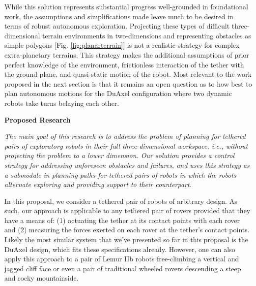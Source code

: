 \documentclass[12pt]{article}
\begin{document}
While this solution represents substantial progress well-grounded in foundational work, the 
assumptions and simplifications made leave much to be desired in terms of robust autonomous
exploration. Projecting these types of difficult three-dimensional terrain environments in two-dimensions and representing obstacles as simple polygons [Fig. \ref{fig:planarterrain}] is not a realistic strategy for complex extra-planetary terrains. 
This strategy makes the additional assumptions of prior perfect knowledge of the environment, frictionless 
interaction of the tether with the ground plane, and quasi-static motion of the robot. 
Most relevant to the work proposed in the next section is that it remains an open question as to how 
best to plan autonomous motions for the DuAxel configuration where two 
dynamic robots take turns belaying each other.


{\bf\noindent Proposed Research}

{\sl The main goal of this research is to address the problem of planning for tethered pairs of exploratory 
robots in their full three-dimensional workspace, i.e., without projecting the problem to a lower dimension. 
Our solution provides a control strategy for addressing unforeseen obstacles and failures, and uses this strategy 
as a submodule in planning paths for tethered pairs of robots in which the robots alternate exploring and providing 
support to their counterpart.}

In this proposal, we consider a tethered pair of robots of arbitrary design. As such, our approach is applicable 
to any tethered pair of rovers provided that they have a means of: (1) actuating the tether at its contact points with 
each rover and (2) measuring the forces exerted on each rover at the tether's contact points. Likely the most similar system 
that we've presented so far in this proposal is the DuAxel design, which fits these specifications already. However, one can 
also apply this approach to a pair of Lemur IIb robots free-climbing a vertical and jagged cliff face or even a pair of traditional 
wheeled rovers descending a steep and rocky mountainside. 
\end{document}
